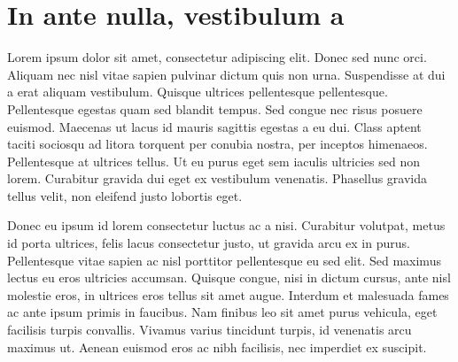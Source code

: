 \chapter{In ante nulla, vestibulum a}
\label{cha:intro}

Lorem ipsum dolor sit amet, consectetur adipiscing elit. Donec sed nunc orci. Aliquam nec nisl vitae sapien pulvinar dictum quis non urna. Suspendisse at dui a erat aliquam vestibulum. Quisque ultrices pellentesque pellentesque. Pellentesque egestas quam sed blandit tempus. Sed congue nec risus posuere euismod. Maecenas ut lacus id mauris sagittis egestas a eu dui. Class aptent taciti sociosqu ad litora torquent per conubia nostra, per inceptos himenaeos. Pellentesque at ultrices tellus. Ut eu purus eget sem iaculis ultricies sed non lorem. Curabitur gravida dui eget ex vestibulum venenatis. Phasellus gravida tellus velit, non eleifend justo lobortis eget. 
\cite{coulouris}

Donec eu ipsum id lorem consectetur luctus ac a nisi. Curabitur volutpat, metus id porta ultrices, felis lacus consectetur justo, ut gravida arcu ex in purus. Pellentesque vitae sapien ac nisl porttitor pellentesque eu sed elit. Sed maximus lectus eu eros ultricies accumsan. Quisque congue, nisi in dictum cursus, ante nisl molestie eros, in ultrices eros tellus sit amet augue. Interdum et malesuada fames ac ante ipsum primis in faucibus. Nam finibus leo sit amet purus vehicula, eget facilisis turpis convallis. Vivamus varius tincidunt turpis, id venenatis arcu maximus ut. Aenean euismod eros ac nibh facilisis, nec imperdiet ex suscipit.
\cite{dalal}




